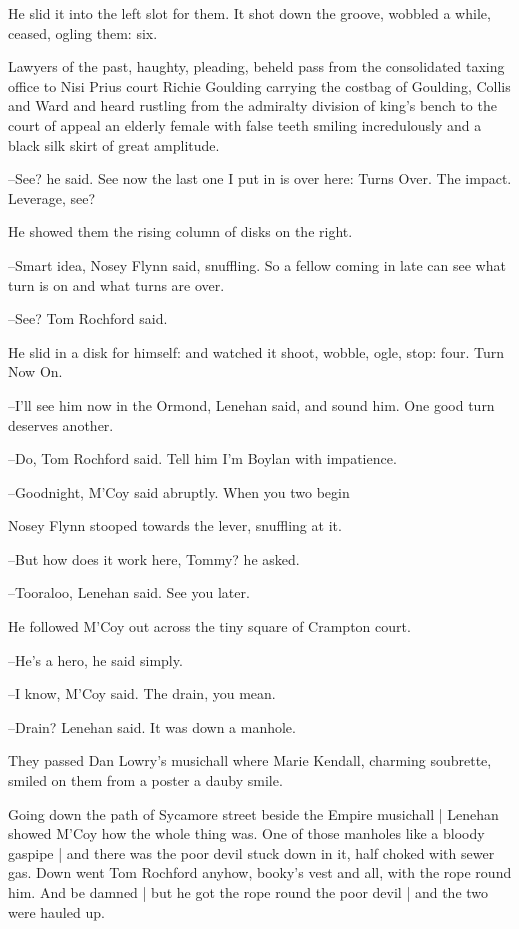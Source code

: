 He slid it into the left slot for them.
It shot down the groove,
wobbled a while,
ceased,
ogling them:
six.

Lawyers of the past, haughty, pleading,
beheld pass from the
consolidated taxing office
to Nisi Prius court
Richie Goulding carrying
the costbag of Goulding, Collis and Ward
and heard rustling from the
admiralty division of king's bench
to the court of appeal
an elderly
female with false teeth smiling incredulously
and a black silk skirt of
great amplitude.

--See?
he said.
See now the last one I put in is over here:
Turns Over.
The impact. Leverage, see?

He showed them the rising column of disks on the right.

--Smart idea,
Nosey Flynn said, snuffling.
So a fellow coming in late can
see what turn is on and what turns are over.

--See?
Tom Rochford said.

He slid in a disk for himself:
and watched it shoot, wobble, ogle, stop:
four.
Turn Now On.

--I'll see him now in the Ormond,
Lenehan said,
and sound him.
One good
turn deserves another.

--Do,
Tom Rochford said.
Tell him I'm Boylan with impatience.

--Goodnight,
M'Coy said abruptly.
When you two begin

Nosey Flynn stooped towards the lever,
snuffling at it.

--But how does it work here, Tommy?
he asked.

--Tooraloo,
Lenehan said.
See you later.

He followed M'Coy out
across the tiny square of Crampton court.

--He's a hero,
he said simply.

--I know,
M'Coy said.
The drain, you mean.

--Drain?
Lenehan said.
It was down a manhole.

They passed Dan Lowry's musichall
where Marie Kendall, charming
soubrette,
smiled on them from a poster
a dauby smile.

Going down the path of Sycamore street beside the Empire musichall |
Lenehan showed M'Coy how the whole thing was.
One of those manholes like a bloody gaspipe |
and there was the poor devil stuck down in it,
half choked with sewer gas.
Down went Tom Rochford anyhow,
booky's vest and all,
with the rope round him.
And be damned |
but he got the rope round the poor devil |
and the two were hauled up.


